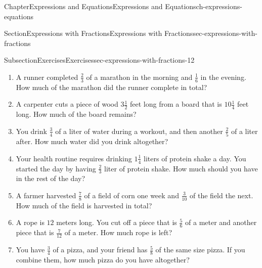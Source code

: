 \documentclass[twoside,11pt,]{book}
\numberwithin{equation}{chapter}
\begin{document}
\begin{chapterptx}{Chapter}{Expressions and Equations}{}{Expressions and Equations}{}{}{ch-expressions-equations}
\begin{sectionptx}{Section}{Expressions with Fractions}{}{Expressions with Fractions}{}{}{sec-expressions-with-fractions}
\begin{subsectionptx}{Subsection}{Exercises}{}{Exercises}{}{}{sec-expressions-with-fractions-12}
\begin{enumerate}
\begin{enumerate}
\item{}\((\frac{a}{5} - \frac{2a}{15}) \div \frac{a}{3}\).%
\item{}\((\frac{y}{6} + \frac{y}{4}) \cdot \frac{3}{2}\).%
\item{}\((\frac{2m}{7} - \frac{m}{14}) \div \frac{m}{21}\).%
\item{}\(\frac{x}{2} + \frac{2x}{3} - \frac{x}{6}\).%
\item{}\(\frac{3a}{4} \cdot \frac{2}{3a} + \frac{a}{2}\).%
\item{}\(\frac{y}{3} + \frac{2y}{9} \div \frac{y}{6}\).%
\item{}\(\frac{m}{5} - \frac{3m}{10} + \frac{7m}{20}\).%
\item{}\(\frac{2x}{3} + \frac{x}{4} - \frac{3x}{8} \cdot \frac{2}{3}\).%
\item{}\(\frac{5a}{6} - (\frac{a}{4} + \frac{a}{12}) \div \frac{a}{3}\).%
\item{}\(\frac{3y}{8} + \frac{y}{6} - \frac{y}{4} \cdot \frac{9}{2}\).%
\item{}\((\frac{2m}{9} + \frac{m}{6} - \frac{m}{18}) \cdot \frac{3}{2}\).%
\end{enumerate}
%
\item{}A runner completed \(\frac{2}{3}\) of a marathon in the morning and \(\frac{1}{6}\) in the evening. How much of the marathon did the runner complete in total?%
\item{}A carpenter cuts a piece of wood \(3\frac{1}{2}\) feet long from a board that is \(10\frac{1}{4}\) feet long. How much of the board remains?%
\item{}You drink \(\frac{3}{4}\) of a liter of water during a workout, and then another \(\frac{2}{5}\) of a liter after. How much water did you drink altogether?%
\item{}Your health routine requires drinking \(1\frac{1}{4}\) liters of protein shake a day. You started the day by having \(\frac23\) liter of protein shake. How much should you have in the rest of the day?%
\item{}A farmer harvested \(\frac{7}{8}\) of a field of corn one week and \(\frac{3}{10}\) of the field the next. How much of the field is harvested in total?%
\item{}A rope is \(12\) meters long. You cut off a piece that is \(\frac{5}{6}\) of a meter and another piece that is \(\frac{7}{12}\) of a meter. How much rope is left?%
\item{}You have \(\frac{3}{4}\) of a pizza, and your friend has \(\frac{5}{8}\) of the same size pizza. If you combine them, how much pizza do you have altogether?%

\end{enumerate}
\end{subsectionptx}
\end{sectionptx}
\end{chapterptx}
\end{document}
